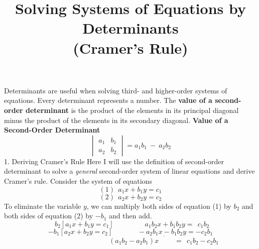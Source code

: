 \documentclass{article}
\begin{document}
\title{Solving Systems of Equations by Determinants \\ (Cramer's Rule)}
\date{}
\maketitle
\begin{flushleft}
Determinants are useful when solving third- and higher-order systems of equations. Every determinant represents a number. The {\bf{value of a second-order determinant}} is the product of the elements in its principal diagonal minus the product of the elements in its secondary diagonal.
\linebreak
\linebreak
\linebreak
{\large{{\bf{Value of a Second-Order Determinant}}}}
\linebreak
\[ \begin{vmatrix} a_{1} & b_{1} \\ a_{2} & b_{2}\end{vmatrix} = a_{1}b_{1} \ - \ a_{2}b_{2} \]
\linebreak
\linebreak
\linebreak
{\large{1. Deriving Cramer's Rule}}
\linebreak
\linebreak
Here I will use the definition of second-order determinant to solve a {\it{general}} second-order system of linear equations and derive Cramer's rule. Consider the system of equations
\linebreak
\begin{equation*} 
(1) \ \ a_1 x + b_1 y = c_1
\end{equation*}
\begin{equation*}
(2) \ \ a_2 x + b_2 y = c_2
\end{equation*}
\linebreak
\linebreak
To eliminate the variable $y$, we can multiply both sides of equation (1) by $b_2$ and both sides of equation (2) by $-b_1$ and then add.
\linebreak
\linebreak
\[ \ \ b_2[a_1x + b_1y = c_1] \ \ \ \ \ \ \ \ \ \ \ \ \ \ \ \ \ \ \ \ a_1b_2x + b_1b_2y = \ \ c_1b_2 \]
\[ -b_1[a_2x + b_2y = c_2] \ \ \ \ \ \ \ \ \ \ \ \ \ \ \ \ -a_2b_1x - b_1b_2y = -c_2b_1 \]
\[ \ \ \ \ \ \ \ \ \ \ \ \ \ \ \ \ \ \ \ \ \ \ \ \ \ \ \ \ \ \ \ \ \ \ \ \ \ \ \ \ \ \ \ \overline{(a_1b_2 - a_2b_1)x  \ \ \ \ \ \ \ \ \ \ = \ \ c_1b_2 - c_2b_1}\]

\end{flushleft}
\end{document}
